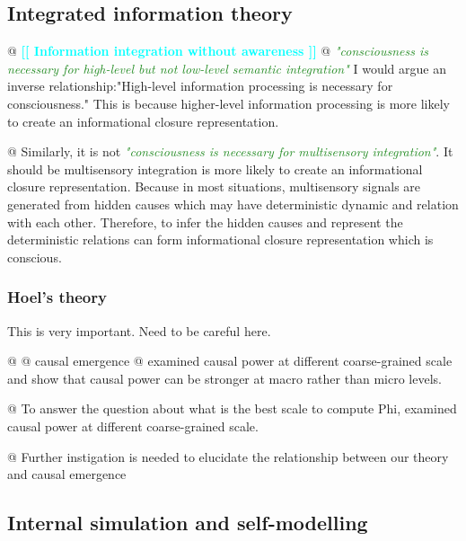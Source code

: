 \documentclass[utf8]{article}
\newenvironment{ants}
			{
			 \begin{easylist}[itemize]
			}
			{
			\end{easylist}
			}
\newcommand{\rewrite}[1]{\textcolor{ForestGreen}{\textit{"#1"}}\newline}
\newcommand{\ideaBox}[1]{
				\begin{tcolorbox}[hyphenationfix, width=12cm, colback=Thistle!50!white, flush right]
					#1
				\end{tcolorbox}
			}
\newcommand{\toWrite}[1]{\noindent
			\textcolor{Cyan}{\textbf{[[ #1 ]]}}}
\newcommand{\callforhelp}[1]{\todo[color=SpringGreen]{#1}}
\begin{document}
		\subsection{Integrated information theory\callforhelp{Help from Jun?}}
			\begin{ants}
				@ \toWrite{Information integration without awareness}\cite{Mudrik_Faivre_Koch}
				@ \rewrite{consciousness is necessary for high-level but not low-level semantic integration}\cite{Mudrik_Faivre_Koch} I would argue an inverse relationship:"High-level information processing is necessary for consciousness." This is because higher-level information processing is more likely to create an informational closure representation. 
				
				@ Similarly, it is not \rewrite{consciousness is necessary for multisensory integration}. It should be multisensory integration is more likely to create an informational closure representation. Because in most situations, multisensory signals are generated from hidden causes which may have deterministic dynamic and relation with each other. Therefore, to infer the hidden causes and represent the deterministic relations can form informational closure representation which is conscious.  
				
			\end{ants}
						
			
			\subsubsection{Hoel's theory\callforhelp{Help from Martin?}}
				\ideaBox{This is very important. Need to be careful here.}
				
				
				\begin{ants}
					@ \cite{hoel2016can}
					@ causal emergence
					@ \cite{hoel2013quantifying} examined causal power at different coarse-grained scale and show that causal power can be stronger at macro rather than micro levels. 
					
					
					@ To answer the question about what is the best scale to compute Phi, \cite{hoel2016can} examined causal power at different coarse-grained scale. 
					
					@ Further instigation is needed to elucidate the relationship between our theory and causal emergence
					
					
				\end{ants}
				
				
		\subsection{Internal simulation and self-modelling}
		
\end{document}
